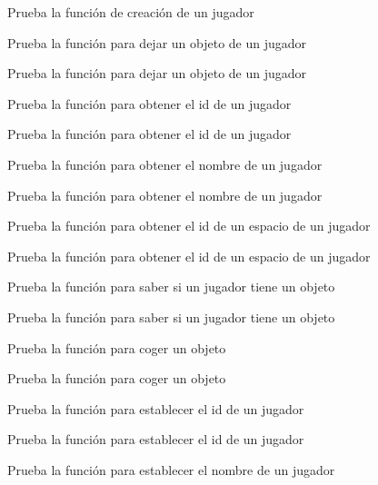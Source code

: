 \begin{DoxyRefList}
Prueba la función de creación de un jugador  
\item[\label{test__test000219}%
\Hypertarget{test__test000219}%
Member \hyperlink{player__test_8h_a914b9b6ed41aa24340919e3dc72d6903}{test1\+\_\+player\+\_\+drop\+\_\+object} ()]Prueba la función para dejar un objeto de un jugador 

Prueba la función para dejar un objeto de un jugador  
\item[\label{test__test000215}%
\Hypertarget{test__test000215}%
Member \hyperlink{player__test_8h_a790a75dc179c00c60c784d3e34c0e5aa}{test1\+\_\+player\+\_\+get\+\_\+id} ()]Prueba la función para obtener el id de un jugador 

Prueba la función para obtener el id de un jugador  
\item[\label{test__test000213}%
\Hypertarget{test__test000213}%
Member \hyperlink{player__test_8h_a94068667d8faa66a4ad293dd2c60f2ef}{test1\+\_\+player\+\_\+get\+\_\+name} ()]Prueba la función para obtener el nombre de un jugador 

Prueba la función para obtener el nombre de un jugador  
\item[\label{test__test000217}%
\Hypertarget{test__test000217}%
Member \hyperlink{player__test_8h_ad3352b068fb75cc3763573f0125431f0}{test1\+\_\+player\+\_\+get\+\_\+space\+\_\+id} ()]Prueba la función para obtener el id de un espacio de un jugador 

Prueba la función para obtener el id de un espacio de un jugador  
\item[\label{test__test000223}%
\Hypertarget{test__test000223}%
Member \hyperlink{player__test_8h_abedc0e75ebffb4e7224f5e5ac0ee3055}{test1\+\_\+player\+\_\+has\+\_\+object} ()]Prueba la función para saber si un jugador tiene un objeto 

Prueba la función para saber si un jugador tiene un objeto  
\item[\label{test__test000221}%
\Hypertarget{test__test000221}%
Member \hyperlink{player__test_8h_afac1cd8f32bcda203e7990c6bb9497a7}{test1\+\_\+player\+\_\+pick\+\_\+object} ()]Prueba la función para coger un objeto 

Prueba la función para coger un objeto  
\item[\label{test__test000209}%
\Hypertarget{test__test000209}%
Member \hyperlink{player__test_8h_a64fa15a235953bea694236b9d7841cbc}{test1\+\_\+player\+\_\+set\+\_\+id} ()]Prueba la función para establecer el id de un jugador 

Prueba la función para establecer el id de un jugador  
\item[\label{test__test000206}%
\Hypertarget{test__test000206}%
Member \hyperlink{player__test_8h_a9d87c09e6af910d695265e3fd77ae3a2}{test1\+\_\+player\+\_\+set\+\_\+name} ()]Prueba la función para establecer el nombre de un jugador 


\end{DoxyRefList}

